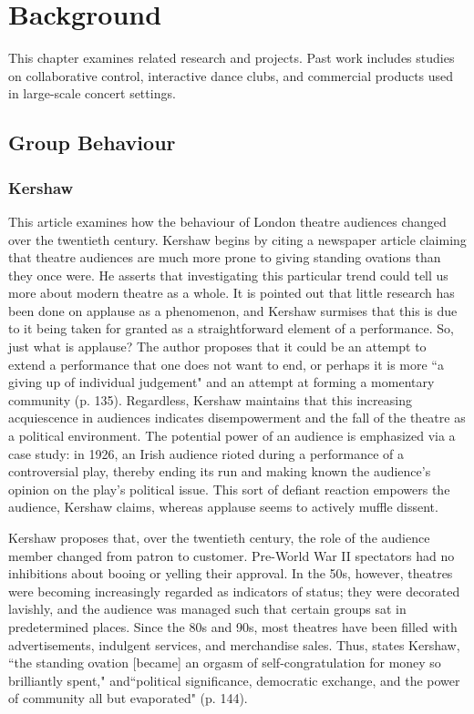\chapter{Background}

This chapter examines related research and projects. Past work includes studies on collaborative control, interactive dance clubs, and commercial products used in large-scale concert settings.

\section{Group Behaviour}

\subsection{Kershaw}

This article examines how the behaviour of London theatre audiences changed over the twentieth century. Kershaw begins by citing a newspaper article claiming that theatre audiences are much more prone to giving standing ovations than they once were. He asserts that investigating this particular trend could tell us more about modern theatre as a whole. It is pointed out that little research has been done on applause as a phenomenon, and Kershaw surmises that this is due to it being taken for granted as a straightforward element of a performance. So, just what is applause? The author proposes that it could be an attempt to extend a performance that one does not want to end, or perhaps it is more ``a giving up of individual judgement" and an attempt at forming a momentary community (p. 135). Regardless, Kershaw maintains that this increasing acquiescence in audiences indicates disempowerment and the fall of the theatre as a political environment. The potential power of an audience is emphasized via a case study: in 1926, an Irish audience rioted during a performance of a controversial play, thereby ending its run and making known the audience's opinion on the play's political issue. This sort of defiant reaction empowers the audience, Kershaw claims, whereas applause seems to actively muffle dissent.

Kershaw proposes that, over the twentieth century, the role of the audience member changed from patron to customer. Pre-World War II spectators had no inhibitions about booing or yelling their approval. In the 50s, however, theatres were becoming increasingly regarded as indicators of status; they were decorated lavishly, and the audience was managed such that certain groups sat in predetermined places. Since the 80s and 90s, most theatres have been filled with advertisements, indulgent services, and merchandise sales. Thus, states Kershaw, ``the standing ovation [became] an orgasm of self-congratulation for money so brilliantly spent," and``political significance, democratic exchange, and the power of community all but evaporated" (p. 144).

